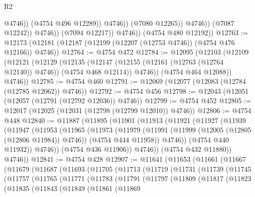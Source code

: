 \begin{lexlean}{R2}
\begin{coremodule}
                                  @4746))
                              (@4754 @496 @12289))
                            @4746))
                        (@7080 @12265))
                      @4746))
                  (@7087 @12242))
                @4746))
            (@7094 @12217))
          @4746))
      (@4754 @480 @12192))
@12763 := @12173 (@12181 (@12187 (@12199 (@12207 (@12753 @4746)) (@4754 @476 @12166)) @4746))
@12764 := @4754 @472
@12784 := @12095
    (@12103
      (@12109
        (@12121
          (@12129
            (@12135
              (@12147 (@12155 (@12161 (@12763 (@12764 @12140)) @4746)) (@4754 @468 @12114))
              @4746))
          (@4754 @464 @12088))
        @4746))
@12785 := @4754 @460
@12791 := @12069 (@12077 (@12083 (@12784 (@12785 @12062)) @4746))
@12792 := @4754 @456
@12798 := @12043 (@12051 (@12057 (@12791 (@12792 @12036)) @4746))
@12799 := @4754 @452
@12805 := @12017 (@12025 (@12031 (@12798 (@12799 @12010)) @4746))
@12806 := @4754 @448
@12840 := @11887
    (@11895
      (@11901
        (@11913
          (@11921
            (@11927
              (@11939
                (@11947
                  (@11953
                    (@11965
                      (@11973
                        (@11979
                          (@11991
                            (@11999 (@12005 (@12805 (@12806 @11984)) @4746))
                            (@4754 @444 @11958))
                          @4746))
                      (@4754 @440 @11932))
                    @4746))
                (@4754 @436 @11906))
              @4746))
          (@4754 @432 @11880))
        @4746))
@12841 := @4754 @428
@12907 := @11641
    (@11653
      (@11661
        (@11667
          (@11679
            (@11687
              (@11693
                (@11705
                  (@11713
                    (@11719
                      (@11731
                        (@11739
                          (@11745
                            (@11757
                              (@11765
                                (@11771
                                  (@11783
                                    (@11791
                                      (@11797
                                        (@11809
                                          (@11817
                                            (@11823
                                              (@11835
                                                (@11843
                                                  (@11849
                                                    (@11861
                                                      (@11869

\end{coremodule}
\end{lexlean}
